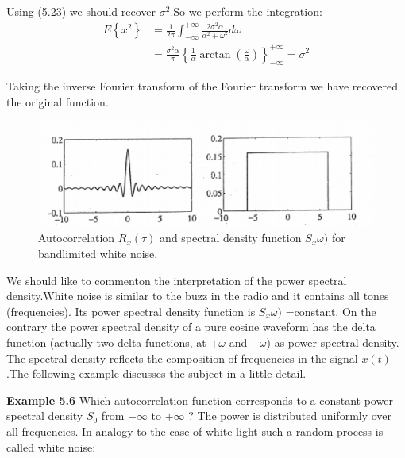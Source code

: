 	      	Using (5.23) we should recover $ \sigma^{2} $.So we perform the integration:
	      	\begin{equation*}
	      	\begin{aligned}
	      	E\left\lbrace x^{2}\right\rbrace&=\frac{1}{2\pi}\int_{-\infty}^{+\infty}\frac{2\sigma^{2}\alpha}{\alpha^{2}+\omega^{2}}d\omega \\
	      	&= \frac{\sigma^{2}\alpha}{\pi}\left\lbrace \frac{1}{\alpha}\arctan(\frac{\omega}{\alpha}) \right\rbrace_{-\infty}^{+\infty} =\sigma^{2}
	      	\end{aligned}
	      	\end{equation*}
	      	 
	      	Taking the inverse Fourier transform of the Fourier transform we have recovered the original function. 
	      	
	      	\begin{figure}[h]
	      		\centering
	      		\includegraphics[width=0.7\linewidth]{TeX_files/Part02/chapter05/image/2}
	      		\caption{ Autocorrelation $ R_{x}(\tau) $ and spectral density function $ S_{x}\omega) $ for bandlimited white noise.}
	      	\end{figure}
	      	
	      
	      	
	      	We should like to commenton the interpretation of the power spectral density.White noise is similar to the buzz in the radio and it contains all tones (frequencies). Its power spectral density function is $ S_{x}\omega) $  =constant. On the contrary the power spectral density of a pure cosine waveform has the delta function (actually two delta functions, at $ +\omega $ and $ -\omega $) as power spectral density. The spectral density reflects the composition of frequencies in the signal $ x(t) $ .The following example discusses the subject in a little detail. 
	      	
	      	\textbf{Example 5.6} Which autocorrelation function corresponds to a constant power spectral density $ S_{0} $ from $ -\infty $ to  $ +\infty $ ? The power is distributed uniformly over all frequencies. In analogy to the case of white light such a random process is called white noise:
	      	
